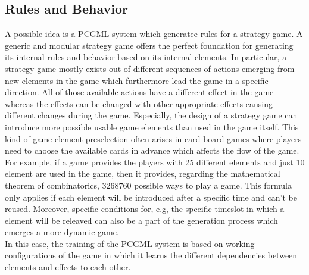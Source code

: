 \documentclass[MGS,Master,english]{twbook}%
\begin{document}
\subsection{Rules and Behavior} \label{idea::rulesAndBehavior}
A possible idea is a PCGML system which generatee rules for a strategy game. A generic and modular strategy game offers the perfect foundation for generating its internal rules and behavior based on its internal elements. In particular, a strategy game mostly exists out of different sequences of actions emerging from new elements in the game which furthermore lead the game in a specific direction. All of those available actions have a different effect in the game whereas the effects can be changed with other appropriate effects causing different changes during the game. Especially, the design of a strategy game can introduce more possible usable game elements than used in the game itself. This kind of game element preselection often arises in card board games where players need to choose the available cards in advance which affects the flow of the game. For example, if a game provides the players with 25 different elements and just 10 element are used in the game, then it provides, regarding the mathematical theorem of combinatorics, 3268760 possible ways to play a game. This formula only applies if each element will be introduced after a specific time and can't be reused. Moreover, specific conditions for, e.g, the specific timeslot in which a element will be releaved can also be a part of the generation process which emerges a more dynamic game.\\
In this case, the training of the PCGML system is based on working configurations of the game in which it learns the different dependencies between elements and effects to each other. 

\end{document}
